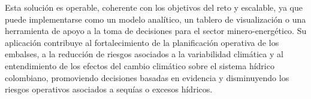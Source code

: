 Esta solución es operable, coherente con los objetivos del reto y escalable, ya que puede implementarse como un modelo analítico, un tablero de visualización o una herramienta de apoyo a la toma de decisiones para el sector minero-energético. Su aplicación contribuye al fortalecimiento de la planificación operativa de los embalses, a la reducción de riesgos asociados a la variabilidad climática y al entendimiento de los efectos del cambio climático sobre el sistema hídrico colombiano, promoviendo decisiones basadas en evidencia y disminuyendo los riesgos operativos asociados a sequías o excesos hídricos.
